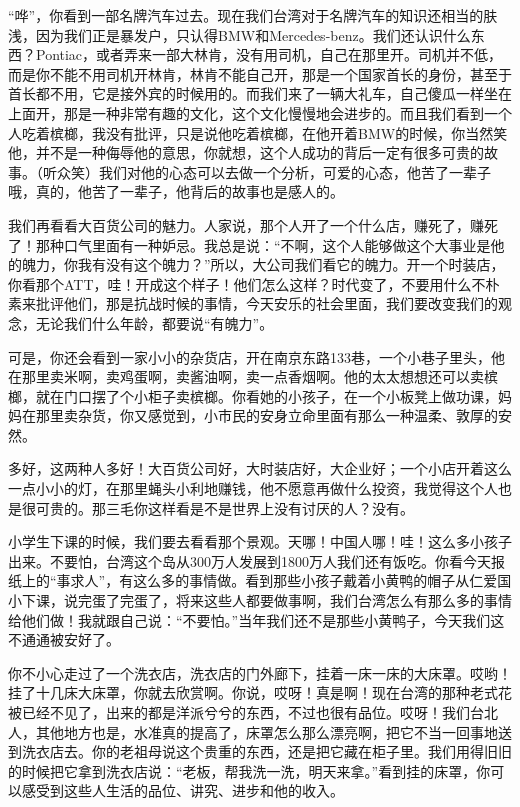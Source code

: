 \par “哗”，你看到一部名牌汽车过去。现在我们台湾对于名牌汽车的知识还相当的肤浅，因为我们正是暴发户，只认得BMW和Mercedes-benz。我们还认识什么东西？Pontiac，或者弄来一部大林肯，没有用司机，自己在那里开。司机并不低，而是你不能不用司机开林肯，林肯不能自己开，那是一个国家首长的身份，甚至于首长都不用，它是接外宾的时候用的。而我们来了一辆大礼车，自己傻瓜一样坐在上面开，那是一种非常有趣的文化，这个文化慢慢地会进步的。而且我们看到一个人吃着槟榔，我没有批评，只是说他吃着槟榔，在他开着BMW的时候，你当然笑他，并不是一种侮辱他的意思，你就想，这个人成功的背后一定有很多可贵的故事。（听众笑）我们对他的心态可以去做一个分析，可爱的心态，他苦了一辈子哦，真的，他苦了一辈子，他背后的故事也是感人的。
\par 我们再看看大百货公司的魅力。人家说，那个人开了一个什么店，赚死了，赚死了！那种口气里面有一种妒忌。我总是说：“不啊，这个人能够做这个大事业是他的魄力，你我有没有这个魄力？”所以，大公司我们看它的魄力。开一个时装店，你看那个ATT，哇！开成这个样子！他们怎么这样？时代变了，不要用什么不朴素来批评他们，那是抗战时候的事情，今天安乐的社会里面，我们要改变我们的观念，无论我们什么年龄，都要说“有魄力”。
\par 可是，你还会看到一家小小的杂货店，开在南京东路133巷，一个小巷子里头，他在那里卖米啊，卖鸡蛋啊，卖酱油啊，卖一点香烟啊。他的太太想想还可以卖槟榔，就在门口摆了个小柜子卖槟榔。你看她的小孩子，在一个小板凳上做功课，妈妈在那里卖杂货，你又感觉到，小市民的安身立命里面有那么一种温柔、敦厚的安然。
\par 多好，这两种人多好！大百货公司好，大时装店好，大企业好；一个小店开着这么一点小小的灯，在那里蝇头小利地赚钱，他不愿意再做什么投资，我觉得这个人也是很可贵的。那三毛你这样看是不是世界上没有讨厌的人？没有。
\par 小学生下课的时候，我们要去看看那个景观。天哪！中国人哪！哇！这么多小孩子出来。不要怕，台湾这个岛从300万人发展到1800万人我们还有饭吃。你看今天报纸上的“事求人”，有这么多的事情做。看到那些小孩子戴着小黄鸭的帽子从仁爱国小下课，说完蛋了完蛋了，将来这些人都要做事啊，我们台湾怎么有那么多的事情给他们做！我就跟自己说：“不要怕。”当年我们还不是那些小黄鸭子，今天我们这不通通被安好了。
\par 你不小心走过了一个洗衣店，洗衣店的门外廊下，挂着一床一床的大床罩。哎哟！挂了十几床大床罩，你就去欣赏啊。你说，哎呀！真是啊！现在台湾的那种老式花被已经不见了，出来的都是洋派兮兮的东西，不过也很有品位。哎呀！我们台北人，其他地方也是，水准真的提高了，床罩怎么那么漂亮啊，把它不当一回事地送到洗衣店去。你的老祖母说这个贵重的东西，还是把它藏在柜子里。我们用得旧旧的时候把它拿到洗衣店说：“老板，帮我洗一洗，明天来拿。”看到挂的床罩，你可以感受到这些人生活的品位、讲究、进步和他的收入。
